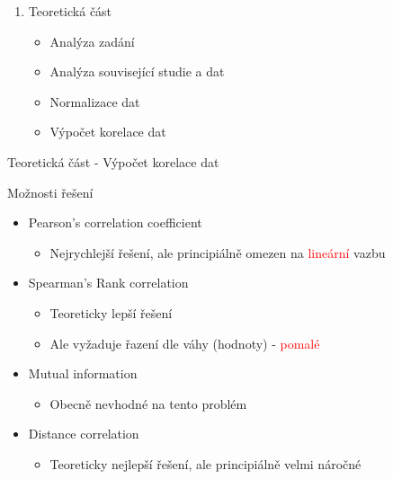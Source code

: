 \documentclass[aspectratio=169, xcolor=dvipsnames]{beamer}
\begin{document}
\begin{frame}{}
	\begin{center}
\begin{enumerate}
    \item Teoretická část
      \begin{itemize}
        \item Analýza zadání 
        \item Analýza související studie a dat
        \item Normalizace dat
        \item Výpočet korelace dat
       \end{itemize}
   \end{enumerate}
	\end{center}
\end{frame}


\begin{frame}{Teoretická část - Výpočet korelace dat}
  \begin{block}{Možnosti řešení}
    \begin{itemize}
        \pause
       \item Pearson's correlation coefficient
         \pause
        \begin{itemize}
          \item Nejrychlejší řešení, ale principiálně omezen na \textcolor{Red}{lineární} vazbu  
        \end{itemize}
        \pause
      \item Spearman's Rank correlation
        \pause
        \begin{itemize}
          \item Teoreticky lepší řešení
            \pause
          \item Ale vyžaduje řazení dle váhy (hodnoty) - \textcolor{Red}{pomalé}
        \end{itemize}
        \pause
      \item Mutual information
        \begin{itemize}
          \item Obecně nevhodné na tento problém 
        \end{itemize}
      \item Distance correlation
        \begin{itemize}
          \item Teoreticky nejlepší řešení, ale principiálně velmi náročné  
        \end{itemize}
    \end{itemize} 
  \end{block} 
\end{frame}
\end{document}
